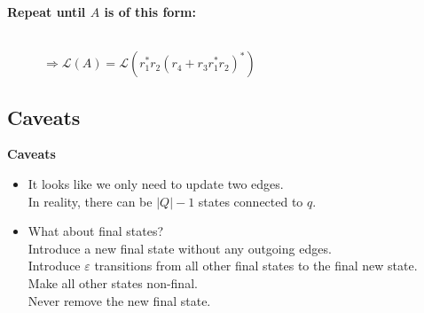 \documentclass{beamer}
\begin{document}
\begin{frame}
    \textbf{Repeat until $A$ is of this form:}

    \begin{figure}
        \\
        $\Rightarrow \mathcal{L}(A) = \mathcal{L}(r_1^* r_2 (r_4 + r_3 r_1^* r_2)^*)$
    \end{figure}


\end{frame}

\subsection*{Caveats}
\begin{frame}
    \textbf{Caveats} \\
    \begin{itemize}
        \item
            It looks like we only need to update two edges. \\
            \pause
            In reality, there can be $|Q|-1$ states connected to $q$.
            \pause
        \item
            What about final states?\\
            \pause
            Introduce a new final state without any outgoing edges. \\
            Introduce $\varepsilon$ transitions from all other final states to the final new state. \\
            Make all other states non-final. \\
            Never remove the new final state.
    \end{itemize}


\end{frame}
\end{document}
